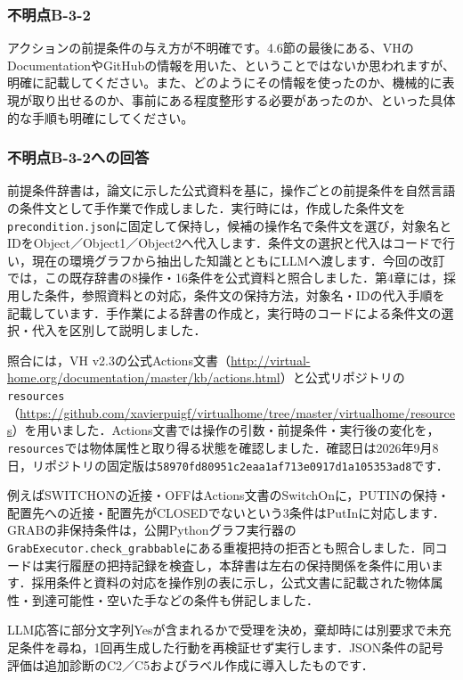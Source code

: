 \documentclass{jsarticle}
\begin{document}
\subsubsection*{不明点B-3-2}
\begin{screen}
アクションの前提条件の与え方が不明確です。4.6節の最後にある、VHのDocumentationやGitHubの情報を用いた、ということではないか思われますが、明確に記載してください。また、どのようにその情報を使ったのか、機械的に表現が取り出せるのか、事前にある程度整形する必要があったのか、といった具体的な手順も明確にしてください。
\end{screen}

\subsubsection*{不明点B-3-2への回答}
前提条件辞書は，論文に示した公式資料を基に，操作ごとの前提条件を自然言語の条件文として手作業で作成しました．実行時には，作成した条件文を\texttt{precondition.json}に固定して保持し，候補の操作名で条件文を選び，対象名とIDをObject／Object1／Object2へ代入します．条件文の選択と代入はコードで行い，現在の環境グラフから抽出した知識とともにLLMへ渡します．今回の改訂では，この既存辞書の8操作・16条件を公式資料と照合しました．第4章には，採用した条件，参照資料との対応，条件文の保持方法，対象名・IDの代入手順を記載しています．手作業による辞書の作成と，実行時のコードによる条件文の選択・代入を区別して説明しました．

照合には，VH v2.3の公式Actions文書（\url{http://virtual-home.org/documentation/master/kb/actions.html}）と公式リポジトリの\texttt{resources}（\url{https://github.com/xavierpuigf/virtualhome/tree/master/virtualhome/resources}）を用いました．Actions文書では操作の引数・前提条件・実行後の変化を，\texttt{resources}では物体属性と取り得る状態を確認しました．確認日は2026年9月8日，リポジトリの固定版は\texttt{58970fd80951c2eaa1af713e0917d1a105353ad8}です．

例えばSWITCHONの近接・OFFはActions文書のSwitchOnに，PUTINの保持・配置先への近接・配置先がCLOSEDでないという3条件はPutInに対応します．GRABの非保持条件は，公開Pythonグラフ実行器の\texttt{GrabExecutor.check\_grabbable}にある重複把持の拒否とも照合しました．同コードは実行履歴の把持記録を検査し，本辞書は左右の保持関係を条件に用います．採用条件と資料の対応を操作別の表に示し，公式文書に記載された物体属性・到達可能性・空いた手などの条件も併記しました．

LLM応答に部分文字列Yesが含まれるかで受理を決め，棄却時には別要求で未充足条件を尋ね，1回再生成した行動を再検証せず実行します．JSON条件の記号評価は追加診断のC2／C5およびラベル作成に導入したものです．
\end{document}
